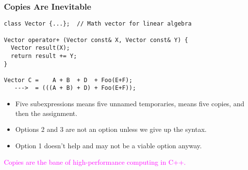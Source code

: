 
\begin{frame}[fragile,t]
\frametitle{Copies Are Inevitable}
{\scriptsize
\begin{verbatim}
class Vector {...};  // Math vector for linear algebra

Vector operator+ (Vector const& X, Vector const& Y) {
  Vector result(X);
  return result += Y;
}

Vector C =    A + B  + D  + Foo(E+F);
   --->  = (((A + B) + D) + Foo(E+F));
\end{verbatim}
}

\begin{itemize}
\item Five subexpressions means five unnamed temporaries, means five
  copies, and then the assignment.
\item Options 2 and 3 are not an option unless we give up the syntax.
\item Option 1 doesn't help and may not be a viable option anyway.
\end{itemize}

\pause

{ \hfill \textcolor{magenta} {Copies are the bane of
    high-performance computing in C++.} \hfill}


\end{frame}

